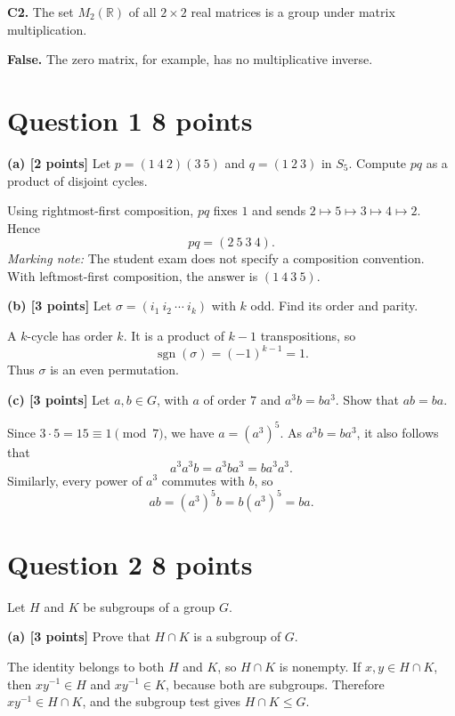 \documentclass[11pt,letterpaper]{article}
\newcommand{\sgn}{\operatorname{sgn}}
\begin{document}
\textbf{C2.} The set $M_2(\mathbb R)$ of all $2\times2$ real matrices is a group under matrix multiplication.
\begin{solutionbox}
\textbf{False.} The zero matrix, for example, has no multiplicative inverse.
\end{solutionbox}

\section*{Question 1 \hfill 8 points}
\textbf{(a) [2 points]} Let $p=(1\ 4\ 2)(3\ 5)$ and $q=(1\ 2\ 3)$ in $S_5$. Compute $pq$ as a product of disjoint cycles.
\begin{solutionbox}
Using rightmost-first composition, $pq$ fixes $1$ and sends
$2\mapsto5\mapsto3\mapsto4\mapsto2$. Hence
\[
  pq=(2\ 5\ 3\ 4).
\]
\emph{Marking note:} The student exam does not specify a composition convention. With leftmost-first composition, the answer is $(1\ 4\ 3\ 5)$.
\end{solutionbox}

\textbf{(b) [3 points]} Let $\sigma=(i_1\ i_2\ \cdots\ i_k)$ with $k$ odd. Find its order and parity.
\begin{solutionbox}
A $k$-cycle has order $k$. It is a product of $k-1$ transpositions, so
\[
  \sgn(\sigma)=(-1)^{k-1}=1.
\]
Thus $\sigma$ is an even permutation.
\end{solutionbox}

\textbf{(c) [3 points]} Let $a,b\in G$, with $a$ of order $7$ and $a^3b=ba^3$. Show that $ab=ba$.
\begin{solutionbox}
Since $3\cdot5=15\equiv1\pmod 7$, we have $a=(a^3)^5$. As $a^3 b = b a^3$, it also follows that $$a^3 a^3 b = a^3 b a^3 = b a^3 a^3.$$ Similarly, every power of $a^3$ commutes with $b$, so
\[
  ab=(a^3)^5b=b(a^3)^5=ba.
\]
\end{solutionbox}

\section*{Question 2 \hfill 8 points}
Let $H$ and $K$ be subgroups of a group $G$.

\textbf{(a) [3 points]} Prove that $H\cap K$ is a subgroup of $G$.
\begin{solutionbox}
The identity belongs to both $H$ and $K$, so $H\cap K$ is nonempty. If $x,y\in H\cap K$, then $xy^{-1}\in H$ and $xy^{-1}\in K$, because both are subgroups. Therefore $xy^{-1}\in H\cap K$, and the subgroup test gives $H\cap K\leq G$.
\end{solutionbox}
\end{document}
